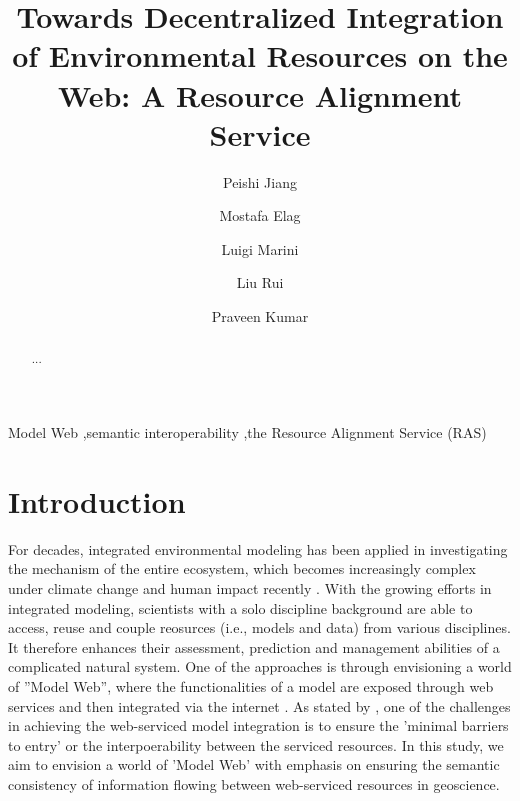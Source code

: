 \documentclass[review]{elsarticle}
\begin{document}
\begin{frontmatter}

\title{Towards Decentralized Integration of Environmental Resources on the Web: A Resource Alignment Service}

\author[address1]{Peishi Jiang}
\author[address1]{Mostafa Elag}
\author[address2]{Luigi Marini}
\author[address2]{Liu Rui}
\author[address1]{Praveen Kumar}


\address[address1]{Ven Te Chow, Hydrosystem Laboratory, Civil and Environmental Engineering, University of Illinois, Urbana, IL, USA}
\address[address2]{National Center for Supercomputing Applications, University of Illinois, Urbana, IL, USA}

\begin{abstract}
...
\end{abstract}

\begin{keyword}
Model Web \sep semantic interoperability \sep the Resource Alignment Service (RAS) 
\end{keyword}

\end{frontmatter}

\linenumbers


\section{Introduction}For decades, integrated environmental modeling has been applied in investigating the mechanism of the entire ecosystem, which becomes increasingly complex under climate change and human impact recently \citep{argent2004, laniak2013}. With the growing efforts in integrated modeling, scientists with a solo discipline background are able to access, reuse and couple reosurces (i.e.,  models and data) from various disciplines. It therefore enhances their assessment, prediction and management abilities of a complicated natural system. One of the approaches is through envisioning a world of ''Model Web'', where the functionalities of a model are exposed through web services and then integrated via the internet \citep{geller2007, geller2008, nativi2013}. As stated by \cite{nativi2013}, one of the challenges in achieving the web-serviced model integration is to ensure the 'minimal barriers to entry' or the interpoerability between the serviced resources. In this study, we aim to envision a world of 'Model Web' with emphasis on ensuring the semantic consistency of information flowing between web-serviced resources in geoscience.
\end{document}
